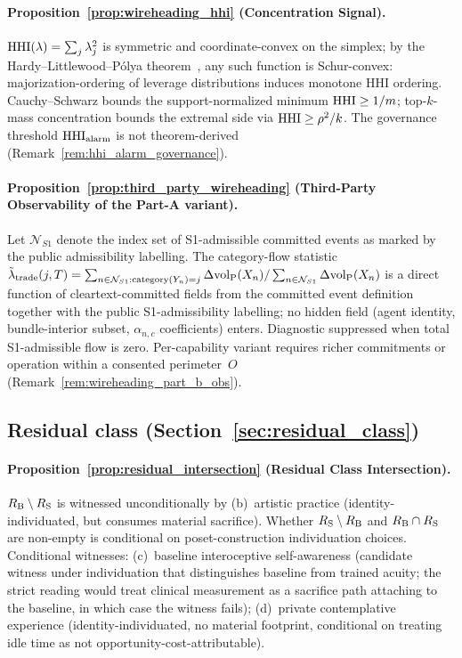 \paragraph{Proposition~\ref{prop:wireheading_hhi}
(Concentration Signal).}
$\mathrm{HHI}(\lambda) = \sum_j \lambda_j^2$ is symmetric and
coordinate-convex on the simplex; by the
Hardy--Littlewood--P\'olya
theorem~\citep{hardy1929majorization,marshall2011inequalities},
any such function is Schur-convex: majorization-ordering of
leverage distributions induces monotone HHI ordering.
Cauchy--Schwarz bounds the support-normalized minimum
$\mathrm{HHI} \geq 1/m$; top-$k$-mass concentration bounds the
extremal side via $\mathrm{HHI} \geq \rho^2/k$.  The governance
threshold $\mathrm{HHI}_{\mathrm{alarm}}$ is not theorem-derived
(Remark~\ref{rem:hhi_alarm_governance}).

\paragraph{Proposition~\ref{prop:third_party_wireheading}
(Third-Party Observability of the Part-A variant).}
Let $\mathcal{N}_{S1}$ denote the index set of
S1-admissible committed events as marked by the public
admissibility labelling.  The category-flow statistic
$\tilde\lambda_{\mathrm{trade}}(j,T) =
\sum_{n \in \mathcal{N}_{S1}: \mathrm{category}(Y_{n}) = j}
\Delta{\operatorname{vol}_{\mathrm{P}}}(X_n) /
\sum_{n \in \mathcal{N}_{S1}} \Delta{\operatorname{vol}_{\mathrm{P}}}(X_n)$ is a direct
function of cleartext-committed fields from the committed
event definition~\citep[Revealed~Sacrifice]{lasser2026paper8a}
together with the public S1-admissibility labelling; no hidden
field (agent identity, bundle-interior subset, $\alpha_{n,c}$
coefficients) enters.  Diagnostic
suppressed when total S1-admissible flow is zero.  Per-capability
variant requires richer commitments or operation within a
consented perimeter~$O$
(Remark~\ref{rem:wireheading_part_b_obs}).

\subsection{Residual class
(Section~\ref{sec:residual_class})}

\paragraph{Proposition~\ref{prop:residual_intersection}
(Residual Class Intersection).}
$R_{\mathrm{B}} \setminus R_{\mathrm{S}}$ is witnessed unconditionally by
(b)~artistic practice (identity-individuated, but consumes
material sacrifice).  Whether $R_{\mathrm{S}} \setminus R_{\mathrm{B}}$ and
$R_{\mathrm{B}} \cap R_{\mathrm{S}}$ are non-empty is conditional on
poset-construction individuation choices.  Conditional
witnesses:
(c)~baseline interoceptive self-awareness (candidate witness
under individuation that distinguishes baseline from trained
acuity; the strict reading would treat clinical measurement
as a sacrifice path attaching to the baseline, in which case
the witness fails);
(d)~private contemplative experience
(identity-individuated, no material footprint, conditional on
treating idle time as not opportunity-cost-attributable).

